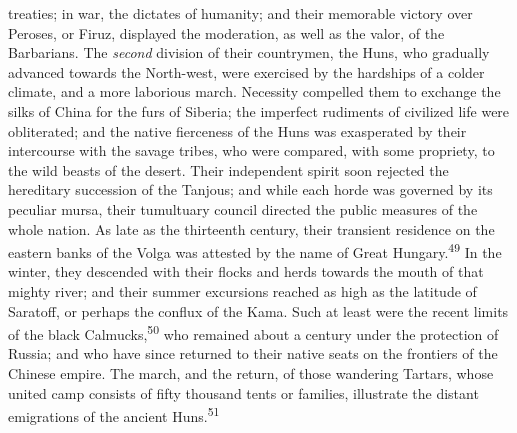 treaties; in war, the dictates of humanity; and their memorable
victory over Peroses, or Firuz, displayed the moderation, as well
as the valor, of the Barbarians. The \textit{second} division of their
countrymen, the Huns, who gradually advanced towards the
North-west, were exercised by the hardships of a colder climate,
and a more laborious march. Necessity compelled them to exchange
the silks of China for the furs of Siberia; the imperfect
rudiments of civilized life were obliterated; and the native
fierceness of the Huns was exasperated by their intercourse with
the savage tribes, who were compared, with some propriety, to the
wild beasts of the desert. Their independent spirit soon rejected
the hereditary succession of the Tanjous; and while each horde
was governed by its peculiar mursa, their tumultuary council
directed the public measures of the whole nation. As late as the
thirteenth century, their transient residence on the eastern
banks of the Volga was attested by the name of Great Hungary.\textsuperscript{49}
In the winter, they descended with their flocks and herds towards
the mouth of that mighty river; and their summer excursions
reached as high as the latitude of Saratoff, or perhaps the
conflux of the Kama. Such at least were the recent limits of the
black Calmucks,\textsuperscript{50} who remained about a century under the
protection of Russia; and who have since returned to their native
seats on the frontiers of the Chinese empire. The march, and the
return, of those wandering Tartars, whose united camp consists of
fifty thousand tents or families, illustrate the distant
emigrations of the ancient Huns.\textsuperscript{51}






